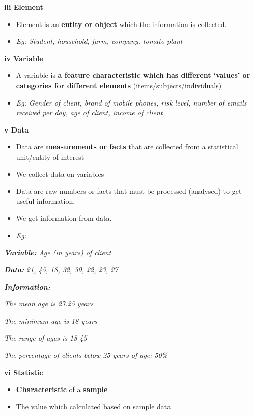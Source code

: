 \documentclass[]{book}
\providecommand{\tightlist}{%
  \setlength{\itemsep}{0pt}\setlength{\parskip}{0pt}}
\begin{document}
\textbf{iii Element}

\begin{itemize}
\tightlist
\item
  Element is an \textbf{entity or object} which the information is collected.
\item
  \emph{Eg: Student, household, farm, company, tomato plant}
\end{itemize}

\textbf{iv Variable}

\begin{itemize}
\tightlist
\item
  A variable is \textbf{a feature characteristic which has different `values' or categories for different elements} (items/subjects/individuals)
\item
  \emph{Eg: Gender of client, brand of mobile phones, risk level, number of emails received per day, age of client, income of client}
\end{itemize}

\textbf{v Data}

\begin{itemize}
\item
  Data are \textbf{measurements or facts} that are collected from a statistical unit/entity of interest
\item
  We collect data on variables
\item
  Data are raw numbers or facts that must be processed (analysed) to get useful information.
\item
  We get information from data.
\item
  \emph{Eg:}
\end{itemize}

\textbf{\emph{Variable:}} \emph{Age (in years) of client}

\textbf{\emph{Data:}} \emph{21, 45, 18, 32, 30, 22, 23, 27}

\textbf{\emph{Information:}}

\emph{The mean age is 27.25 years}

\emph{The minimum age is 18 years}

\emph{The range of ages is 18-45}

\emph{The percentage of clients below 25 years of age: 50\%}

\textbf{vi Statistic}

\begin{itemize}
\tightlist
\item
  \textbf{Characteristic} of a \textbf{sample}
\item
  The value which calculated based on sample data
\end{itemize}
\end{document}
